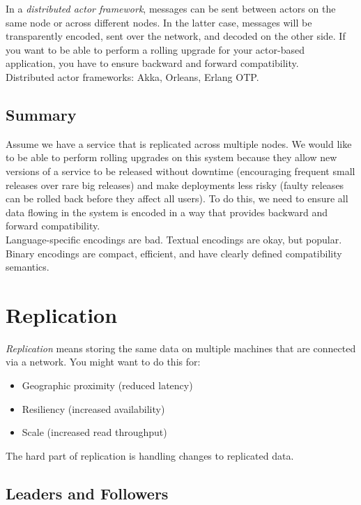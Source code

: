 \documentclass[12pt, titlepage]{article}
\begin{document}
In a \textit{distributed actor framework}, messages can be sent between actors on the same node or across different nodes. In the latter case, messages will be transparently encoded, sent over the network, and decoded on the other side. If you want to be able to perform a rolling upgrade for your actor-based application, you have to ensure backward and forward compatibility. \\

Distributed actor frameworks: Akka, Orleans, Erlang OTP.

\subsection{Summary}

Assume we have a service that is replicated across multiple nodes. We would like to be able to perform rolling upgrades on this system because they allow new versions of a service to be released without downtime (encouraging frequent small releases over rare big releases) and make deployments less risky (faulty releases can be rolled back before they affect all users). To do this, we need to ensure all data flowing in the system is encoded in a way that provides backward and forward compatibility. \\

Language-specific encodings are bad. Textual encodings are okay, but popular. Binary encodings are compact, efficient, and have clearly defined compatibility semantics.

\section{Replication}

\textit{Replication} means storing the same data on multiple machines that are connected via a network. You might want to do this for:

\begin{itemize}
	\item Geographic proximity (reduced latency)
	\item Resiliency (increased availability)
	\item Scale (increased read throughput)
\end{itemize}

The hard part of replication is handling changes to replicated data.

\subsection{Leaders and Followers}
\end{document}
